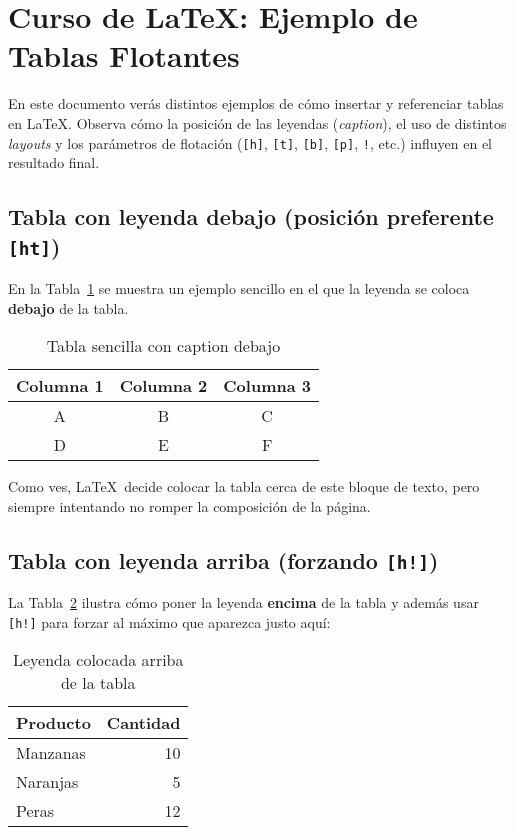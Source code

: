 \documentclass{article}
\begin{document}
\section{Curso de \LaTeX: Ejemplo de Tablas Flotantes}

En este documento verás distintos ejemplos de cómo insertar y 
referenciar tablas en \LaTeX. Observa cómo la posición de las leyendas 
(\emph{caption}), el uso de distintos \emph{layouts} y los parámetros 
de flotación (\texttt{[h]}, \texttt{[t]}, \texttt{[b]}, \texttt{[p]}, \texttt{!}, etc.) 
influyen en el resultado final.

\subsection{Tabla con leyenda debajo (posición preferente \texttt{[ht]})}

En la Tabla~\ref{tab:simple} se muestra un ejemplo sencillo en el que la 
leyenda se coloca \textbf{debajo} de la tabla.

\begin{table}[ht]
    \centering
    \begin{tabular}{c|c|c}
    \hline
    \textbf{Columna 1} & \textbf{Columna 2} & \textbf{Columna 3} \\
    \hline
    A & B & C \\
    D & E & F \\
    \hline
    \end{tabular}
    \caption{Tabla sencilla con caption debajo}
    \label{tab:simple}
\end{table}

Como ves, \LaTeX\ decide colocar la tabla cerca de este bloque de texto,
pero siempre intentando no romper la composición de la página.

\subsection{Tabla con leyenda arriba (forzando \texttt{[h!]})}

La Tabla~\ref{tab:arriba} ilustra cómo poner la leyenda \textbf{encima} 
de la tabla y además usar \texttt{[h!]} para forzar al máximo que aparezca 
justo aquí:

\begin{table}[h!]
    \caption{Leyenda colocada arriba de la tabla}
    \label{tab:arriba}
    \centering
    \begin{tabular}{l r}
        \toprule
        \textbf{Producto} & \textbf{Cantidad} \\
        \midrule
        Manzanas & 10 \\
        Naranjas & 5 \\
        Peras & 12 \\
        \bottomrule
    \end{tabular}
\end{table}
\end{document}
